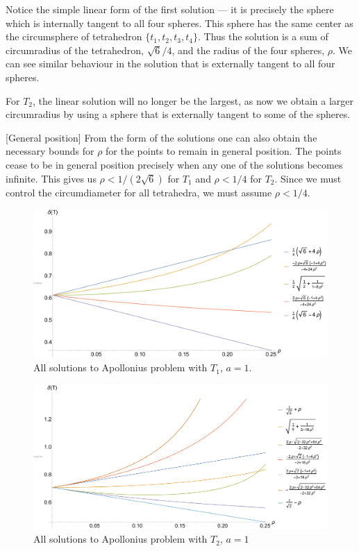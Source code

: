 Notice the simple linear form of the first solution --- it is precisely the sphere which is internally tangent to all four spheres. This sphere has the same center as the circumsphere of tetrahedron $\{t_1,t_2,t_3,t_4\}$. Thus the solution is a sum of circumradius of the tetrahedron, $\sqrt 6 /4$, and the radius of the four spheres, $\rho$. We can see similar behaviour in the solution that is externally tangent to all four spheres.

For $T_2$, the linear solution will no longer be the largest, as now we obtain a larger circumradius by using a sphere that is externally tangent to some of the spheres. 


\begin{remark}\label{rem:GP}[General position]
	From the form of the solutions one can also obtain the necessary bounds for $\rho$ for the points to remain in general position. The points cease to be in general position precisely when any one of the solutions becomes infinite. This gives us $\rho < 1/(2\sqrt 6)$ for $T_1$ and $\rho<1/4$ for $T_2$. Since we must control the circumdiameter for all tetrahedra, we must assume $\rho < 1/4$.
\end{remark}


\begin{figure}
	\includegraphics[width=1\textwidth]{../img/t1.pdf}
	\caption{All solutions to Apollonius problem with $T_1$, $a=1$.}\label{fig:Apollonius1}
\end{figure}

\begin{figure}
	\includegraphics[width=1\textwidth]{../img/t2.pdf}
	\caption{All solutions to Apollonius problem with $T_2$, $a=1$}\label{fig:Apollonius2}
\end{figure}
